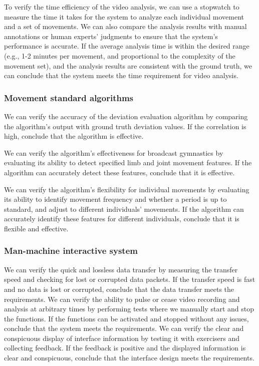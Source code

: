 To verify the time efficiency of the video analysis, we can use a stopwatch to measure the time it takes for the system to analyze each individual movement and a set of movements. We can also compare the analysis results with manual annotations or human experts' judgments to ensure that the system's performance is accurate. If the average analysis time is within the desired range (e.g., 1-2 minutes per movement, and proportional to the complexity of the movement set), and the analysis results are consistent with the ground truth, we can conclude that the system meets the time requirement for video analysis.
\subsubsection{Movement standard algorithms}
We can verify the accuracy of the deviation evaluation algorithm by comparing the algorithm's output with ground truth deviation values. If the correlation is high, conclude that the algorithm is effective.

We can verify the algorithm's effectiveness for broadcast gymnastics by evaluating its ability to detect specified limb and joint movement features. If the algorithm can accurately detect these features, conclude that it is effective.

We can verify the algorithm's flexibility for individual movements by evaluating its ability to identify movement frequency and whether a period is up to standard, and adjust to different individuals' movements. If the algorithm can accurately identify these features for different individuals, conclude that it is flexible and effective.
\subsubsection{Man-machine interactive system}
We can verify the quick and lossless data transfer by measuring the transfer speed and checking for lost or corrupted data packets. If the transfer speed is fast and no data is lost or corrupted, conclude that the data transfer meets the requirements.
We can verify the ability to pulse or cease video recording and analysis at arbitrary times by performing tests where we manually start and stop the functions. If the functions can be activated and stopped without any issues, conclude that the system meets the requirements.
We can verify the clear and conspicuous display of interface information by testing it with exercisers and collecting feedback. If the feedback is positive and the displayed information is clear and conspicuous, conclude that the interface design meets the requirements.


